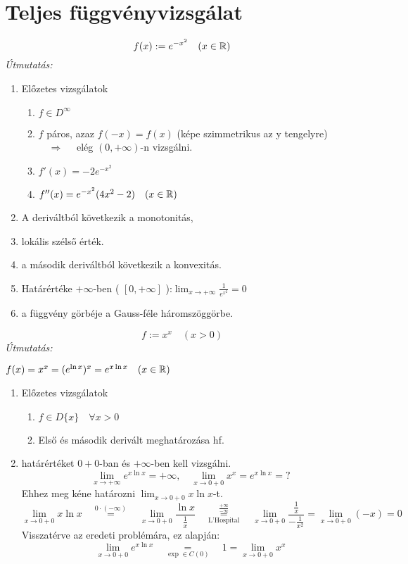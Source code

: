 \documentclass[a4paper,11.5pt]{article}
\begin{document}
	\section{Teljes függvényvizsgálat}
	\begin{task}
		\[ f(x):=e^{-x^2}\quad (x\in\mathbb{R}) \]
		\textit{Útmutatás:}
		
		\begin{enumerate}
			\item Előzetes vizsgálatok
			\begin{enumerate}
				\item $f\in D^\infty$
				\item $f$ páros, azaz $f(-x)=f(x)$ (képe szimmetrikus az y tengelyre) $\quad \Rightarrow\quad $ elég $(0,+\infty)$-n vizsgálni.
				\item $f'(x)=-2e^{-x^2}$
				\item $f''(x)=e^{-x^2}(4x^2-2)\quad (x\in\mathbb{R})$
			\end{enumerate}
			\item A deriváltból következik a monotonitás,
			\item lokális szélső érték.
			\item a második deriváltból következik a konvexitás.
			\item Határértéke $+\infty$-ben ( $[0,+\infty]$ ):\quad $\displaystyle \lim_{x\to+\infty}\frac{1}{e^{x^2}}=0$
			\item a függvény görbéje a Gauss-féle háromszöggörbe.
		\end{enumerate}
	\end{task}
	\begin{task}
		\[ f:=x^x\quad (x>0) \]
		\textit{Útmutatás:}
		
		$f(x)= x^x=(e^{\ln x})^x=e^{x\ln x}\quad (x\in\mathbb{R})$
		\begin{enumerate}
			\item Előzetes vizsgálatok
			\begin{enumerate}
				\item $f\in D\{x\}\quad \forall x>0$
				\item Első és második derivált meghatározása hf.
			\end{enumerate}
			\item határértéket $0+0$-ban és $+\infty$-ben kell vizsgálni.
			\[ \lim_{x\to+\infty}e^{x\ln x}=+\infty,\quad \lim_{x\to0+0}x^x=e^{x\ln x}=? \]
			Ehhez meg kéne határozni $\displaystyle \lim_{x\to0+0}x\ln x$-t.
			\[\displaystyle \lim_{x\to0+0}x\ln x \quad \overset{0\cdot(-\infty)}{=}\quad \lim_{x\to0+0}\frac{\ln x}{\frac{1}{x}}\quad \overset{\frac{+\infty}{-\infty}}{\underset{\text{L'Hospital}}{=}}\quad \lim_{x\to0+0}\frac{\frac{1}{x}}{-\frac{1}{x^2}}=\lim_{x\to0+0}(-x)=0 \]
			Visszatérve az eredeti problémára, ez alapján:
			\[ \lim_{x\to0+0}e^{x\ln x}\quad \underset{\exp\in C(0)}{=}\quad 1=\lim_{x\to0+0}x^x \]
		\end{enumerate}
	\end{task}
\end{document}
